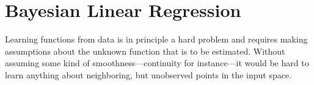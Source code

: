\documentclass[../thesis.tex]{subfiles}
\begin{document}
% 


\section{Bayesian Linear Regression}
Learning functions from data is in principle a hard problem and requires making assumptions about the unknown function that is to be estimated. Without assuming some kind of smoothness---continuity for instance---it would be hard to learn anything about neighboring, but unobserved points in the input space.
\end{document}
